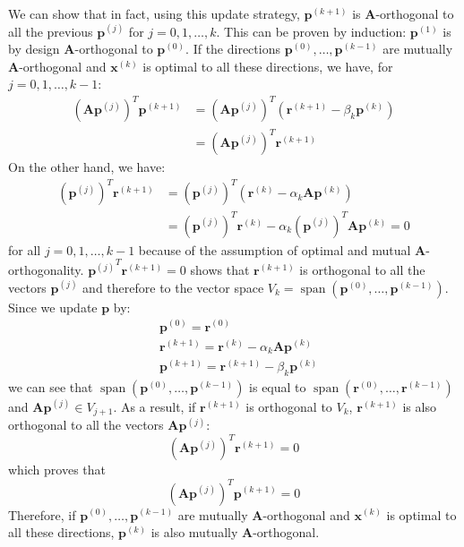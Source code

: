 \documentclass{article}
\DeclareMathOperator{\spn}{span}
\begin{document}
We can show that in fact, using this update strategy, $\mathbf{p}^{(k+1)}$ is $\mathbf{A}$-orthogonal
to all the previous $\mathbf{p}^{(j)}$ for $j = 0,1,\dots,k$.
This can be proven by induction: 
$\mathbf{p}^{(1)}$ is by design $\mathbf{A}$-orthogonal to $\mathbf{p}^{(0)}$. 
If the directions $\mathbf{p}^{(0)}, \dots, \mathbf{p}^{(k-1)}$ are mutually $\mathbf{A}$-orthogonal
and $\mathbf{x}^{(k)}$ is optimal to all these directions, we have, for 
$j = 0, 1, \dots, k-1$:
\begin{align*}
    \left(\mathbf{A} \mathbf{p}^{(j)} \right)^T \mathbf{p}^{(k+1)} 
    &= \left(\mathbf{A} \mathbf{p}^{(j)} \right)^T 
            \left( \mathbf{r}^{(k+1)} - \beta_k \mathbf{p}^{(k)} \right) \\ 
    &= \left(\mathbf{A} \mathbf{p}^{(j)} \right)^T \mathbf{r}^{(k+1)} 
\end{align*}
On the other hand, we have:
\begin{align*}
    \left(\mathbf{p}^{(j)} \right)^T \mathbf{r}^{(k+1)} 
    &= \left(\mathbf{p}^{(j)} \right)^T 
        \left( \mathbf{r}^{(k)} - \alpha_k \mathbf{A}\mathbf{p}^{(k)}\right)  \\
    &= \left(\mathbf{p}^{(j)} \right)^T \mathbf{r}^{(k)} 
       - \alpha_k  \left(\mathbf{p}^{(j)} \right)^T \mathbf{A}\mathbf{p}^{(k)} = 0
\end{align*}
for all $j = 0, 1, \dots, k-1$ because of the assumption of optimal and mutual $\mathbf{A}$-orthogonality.
$\left.\mathbf{p}^{(j)} \right.^T \mathbf{r}^{(k+1)} = 0$ shows that $\mathbf{r}^{(k+1)}$ is 
orthogonal to all the vectors $\mathbf{p}^{(j)}$ and therefore to the vector space 
$V_k = \spn(\mathbf{p}^{(0)}, \dots, \mathbf{p}^{(k-1)})$. 
Since we update $\mathbf{p}$ by:
\begin{align*}
    & \mathbf{p}^{(0)} = \mathbf{r}^{(0)} \\
    & \mathbf{r}^{(k+1)} = \mathbf{r}^{(k)} - \alpha_k \mathbf{A}\mathbf{p}^{(k)} \\
    & \mathbf{p}^{(k+1)} = \mathbf{r}^{(k+1)} - \beta_k \mathbf{p}^{(k)}
\end{align*}
we can see that $\spn(\mathbf{p}^{(0)}, \dots, \mathbf{p}^{(k-1)})$ is equal to 
$\spn(\mathbf{r}^{(0)}, \dots, \mathbf{r}^{(k-1)})$ and $\mathbf{A}\mathbf{p}^{(j)} \in V_{j+1}$.
As a result, if $\mathbf{r}^{(k+1)}$ is orthogonal to $V_k$, 
$\mathbf{r}^{(k+1)}$ is also orthogonal to all the vectors $\mathbf{A} \mathbf{p}^{(j)}$:
\begin{equation}
    \left(\mathbf{A} \mathbf{p}^{(j)} \right)^T \mathbf{r}^{(k+1)} = 0
\end{equation}
which proves that 
\begin{equation}
    \left(\mathbf{A} \mathbf{p}^{(j)} \right)^T \mathbf{p}^{(k+1)} = 0
\end{equation}
Therefore, if $\mathbf{p}^{(0)}, \dots, \mathbf{p}^{(k-1)}$ are mutually $\mathbf{A}$-orthogonal
and $\mathbf{x}^{(k)}$ is optimal to all these directions, $\mathbf{p}^{(k)}$ is also mutually
$\mathbf{A}$-orthogonal.
\end{document}
